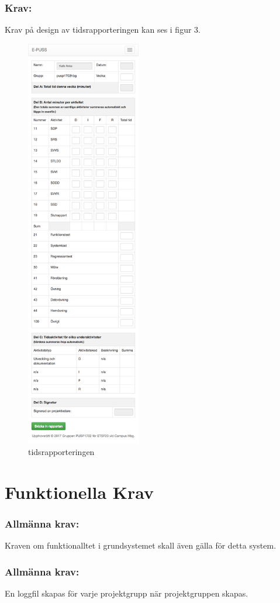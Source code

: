 \documentclass[paper=a4, fontsize=11pt,twoside]{article}
\begin{document}
\newpage
\subsubsection{Krav:} Krav på design av tidsrapporteringen kan ses i figur 3.
\begin{figure}[H]
\centering
\includegraphics[width=5cm]{prtscn-tidrapportering.png}
\caption{tidsrapporteringen}
\end{figure}


\section{Funktionella Krav}
\subsubsection{Allmänna krav:}
Kraven om funktionalltet i grundsystemet skall även gälla för detta system.
\subsubsection{Allmänna krav:}
En loggfil skapas för varje projektgrupp när projektgruppen skapas.
\end{document}
